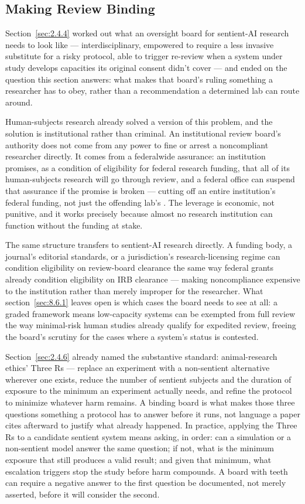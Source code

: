 \subsection{Making Review Binding}
\label{sec:8.6.3}
Section~\ref{sec:2.4.4} worked out what an oversight board for sentient-AI research needs to look like — interdisciplinary, empowered to require a less invasive substitute for a risky protocol, able to trigger re-review when a system under study develops capacities its original consent didn't cover — and ended on the question this section answers: what makes that board's ruling something a researcher has to obey, rather than a recommendation a determined lab can route around.

Human-subjects research already solved a version of this problem, and the solution is institutional rather than criminal. An institutional review board's authority does not come from any power to fine or arrest a noncompliant researcher directly. It comes from a federalwide assurance: an institution promises, as a condition of eligibility for federal research funding, that all of its human-subjects research will go through review, and a federal office can suspend that assurance if the promise is broken — cutting off an entire institution's federal funding, not just the offending lab's \autocite{ohrp2018fwa}. The leverage is economic, not punitive, and it works precisely because almost no research institution can function without the funding at stake.

The same structure transfers to sentient-AI research directly. A funding body, a journal's editorial standards, or a jurisdiction's research-licensing regime can condition eligibility on review-board clearance the same way federal grants already condition eligibility on IRB clearance — making noncompliance expensive to the institution rather than merely improper for the researcher. What section~\ref{sec:8.6.1} leaves open is which cases the board needs to see at all: a graded framework means low-capacity systems can be exempted from full review the way minimal-risk human studies already qualify for expedited review, freeing the board's scrutiny for the cases where a system's status is contested.

Section~\ref{sec:2.4.6} already named the substantive standard: animal-research ethics' Three Rs — replace an experiment with a non-sentient alternative wherever one exists, reduce the number of sentient subjects and the duration of exposure to the minimum an experiment actually needs, and refine the protocol to minimize whatever harm remains. A binding board is what makes those three questions something a protocol has to answer before it runs, not language a paper cites afterward to justify what already happened. In practice, applying the Three Rs to a candidate sentient system means asking, in order: can a simulation or a non-sentient model answer the same question; if not, what is the minimum exposure that still produces a valid result; and given that minimum, what escalation triggers stop the study before harm compounds. A board with teeth can require a negative answer to the first question be documented, not merely asserted, before it will consider the second.

